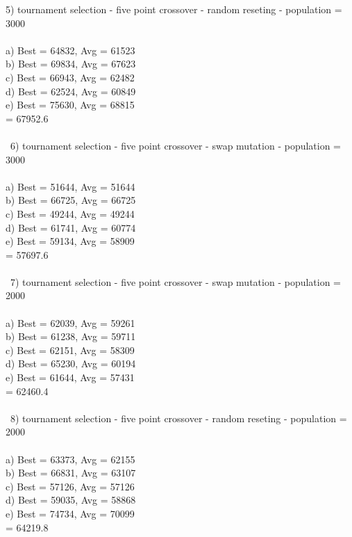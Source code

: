 \documentclass[12pt]{article}
\newcommand\tab[1][1cm]{\hspace*{#1}}
\begin{document}
5) tournament selection - five point crossover - random reseting - population = 3000\\\\
\tab a) Best = 64832, Avg = 61523\\
\tab b) Best = 69834, Avg = 67623\\
\tab c) Best = 66943, Avg = 62482\\
\tab d) Best = 62524, Avg = 60849\\
\tab e) Best = 75630, Avg = 68815\\
\tab {} = 67952.6\\\\\
6) tournament selection - five point crossover -  swap mutation - population = 3000\\\\
\tab a) Best = 51644, Avg = 51644\\
\tab b) Best = 66725, Avg = 66725\\
\tab c) Best = 49244, Avg = 49244\\
\tab d) Best = 61741, Avg = 60774\\
\tab e) Best = 59134, Avg = 58909\\
\tab {} = 57697.6\\\\\
7) tournament selection - five point crossover - swap mutation - population = 2000\\\\
\tab a) Best = 62039, Avg = 59261\\
\tab b) Best = 61238, Avg = 59711\\
\tab c) Best = 62151, Avg = 58309\\
\tab d) Best = 65230, Avg = 60194\\
\tab e) Best = 61644, Avg = 57431\\
\tab \boldsymbol{AvgBest:} = 62460.4\\\\\
8) tournament selection - five point crossover - random reseting - population = 2000\\\\
\tab a) Best = 63373, Avg = 62155\\
\tab b) Best = 66831, Avg = 63107\\
\tab c) Best = 57126, Avg = 57126\\
\tab d) Best = 59035, Avg = 58868\\
\tab e) Best = 74734, Avg = 70099\\
\tab \boldsymbol{AvgBest:} = 64219.8\\\\\
\end{document}
